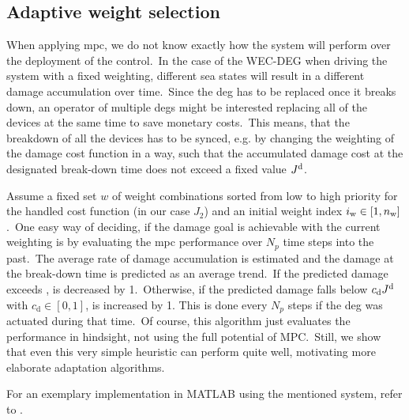 \subsection{Adaptive weight selection}
When applying \ac{mpc}, we do not know exactly how the system will perform over the deployment of the control.\ 
In the case of the WEC-DEG when driving the system with a fixed weighting, different sea states will result in a different damage accumulation over time.\ 
Since the \ac{deg} has to be replaced once it breaks down, an operator of multiple \acp{deg} might be interested replacing all of the devices at the same time to save monetary costs.\ 
This means, that the breakdown of all the devices has to be synced, e.g. by changing the weighting of the damage cost function in a way, such that the accumulated damage cost at the designated break-down time \tbd does not exceed a fixed value $J^\mathrm{d}$.\ 

Assume a fixed set $w$ of \nw weight combinations sorted from low to high priority for the handled cost function (in our case $J_2$) and an initial weight index $i_\mathrm{w} \in [1, n_\mathrm{w}]$.\ 
One easy way of deciding, if the damage goal is achievable with the current weighting is by evaluating the \ac{mpc} performance over $N_p$ time steps into the past.\ 
The average rate of damage accumulation \Jps is estimated and the damage at the break-down time is predicted as an average trend.\
If the predicted damage exceeds \Jd, \iw is decreased by 1.\ 
Otherwise, if the predicted damage falls below $c_\mathrm{d}J^\mathrm{d}$ with $c_\mathrm{d}\in\left[0, 1\right]$, \iw is increased by 1.
This is done every $N_p$ steps if the \ac{deg} was actuated during that time.\
Of course, this algorithm just evaluates the performance in hindsight, not using the full potential of MPC.\ 
Still, we show that even this very simple heuristic can perform quite well, motivating more elaborate adaptation algorithms.
%

For an exemplary implementation in MATLAB using the mentioned system, refer to .